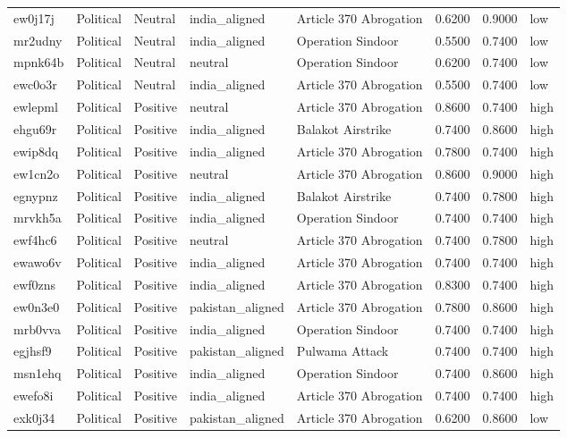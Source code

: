 \begin{longtable}{lllllrrl}
ew0j17j & Political & Neutral & india\_aligned & Article 370 Abrogation & 0.6200 & 0.9000 & low \\
mr2udny & Political & Neutral & india\_aligned & Operation Sindoor & 0.5500 & 0.7400 & low \\
mpnk64b & Political & Neutral & neutral & Operation Sindoor & 0.6200 & 0.7400 & low \\
ewc0o3r & Political & Neutral & india\_aligned & Article 370 Abrogation & 0.5500 & 0.7400 & low \\
ewlepml & Political & Positive & neutral & Article 370 Abrogation & 0.8600 & 0.7400 & high \\
ehgu69r & Political & Positive & india\_aligned & Balakot Airstrike & 0.7400 & 0.8600 & high \\
ewip8dq & Political & Positive & india\_aligned & Article 370 Abrogation & 0.7800 & 0.7400 & high \\
ew1cn2o & Political & Positive & neutral & Article 370 Abrogation & 0.8600 & 0.9000 & high \\
egnypnz & Political & Positive & india\_aligned & Balakot Airstrike & 0.7400 & 0.7800 & high \\
mrvkh5a & Political & Positive & india\_aligned & Operation Sindoor & 0.7400 & 0.7400 & high \\
ewf4hc6 & Political & Positive & neutral & Article 370 Abrogation & 0.7400 & 0.7800 & high \\
ewawo6v & Political & Positive & india\_aligned & Article 370 Abrogation & 0.7400 & 0.7400 & high \\
ewf0zns & Political & Positive & india\_aligned & Article 370 Abrogation & 0.8300 & 0.7400 & high \\
ew0n3e0 & Political & Positive & pakistan\_aligned & Article 370 Abrogation & 0.7800 & 0.8600 & high \\
mrb0vva & Political & Positive & india\_aligned & Operation Sindoor & 0.7400 & 0.7400 & high \\
egjhsf9 & Political & Positive & pakistan\_aligned & Pulwama Attack & 0.7400 & 0.7400 & high \\
msn1ehq & Political & Positive & india\_aligned & Operation Sindoor & 0.7400 & 0.8600 & high \\
ewefo8i & Political & Positive & india\_aligned & Article 370 Abrogation & 0.7400 & 0.7400 & high \\
exk0j34 & Political & Positive & pakistan\_aligned & Article 370 Abrogation & 0.6200 & 0.8600 & low \\

\end{longtable}

